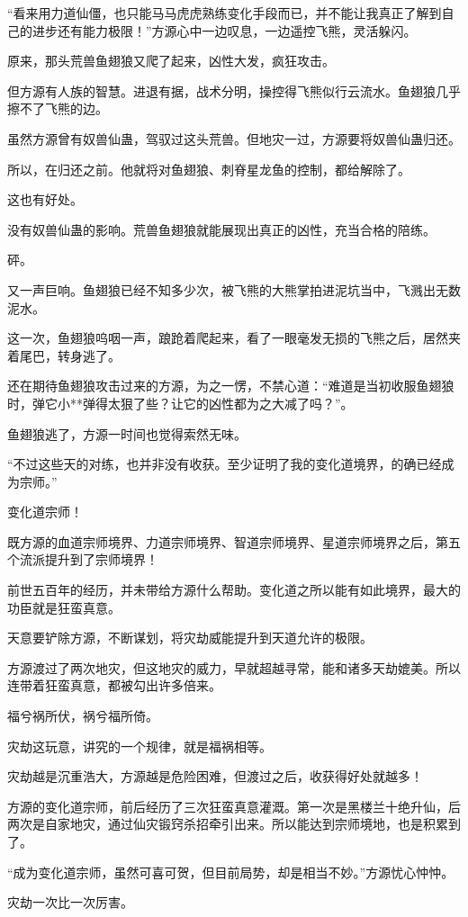 \begin{this_body}
“看来用力道仙僵，也只能马马虎虎熟练变化手段而已，并不能让我真正了解到自己的进步还有能力极限！”方源心中一边叹息，一边遥控飞熊，灵活躲闪。

原来，那头荒兽鱼翅狼又爬了起来，凶性大发，疯狂攻击。

但方源有人族的智慧。进退有据，战术分明，操控得飞熊似行云流水。鱼翅狼几乎擦不了飞熊的边。

虽然方源曾有奴兽仙蛊，驾驭过这头荒兽。但地灾一过，方源要将奴兽仙蛊归还。

所以，在归还之前。他就将对鱼翅狼、刺脊星龙鱼的控制，都给解除了。

这也有好处。

没有奴兽仙蛊的影响。荒兽鱼翅狼就能展现出真正的凶性，充当合格的陪练。

砰。

又一声巨响。鱼翅狼已经不知多少次，被飞熊的大熊掌拍进泥坑当中，飞溅出无数泥水。

这一次，鱼翅狼呜咽一声，踉跄着爬起来，看了一眼毫发无损的飞熊之后，居然夹着尾巴，转身逃了。

还在期待鱼翅狼攻击过来的方源，为之一愣，不禁心道：“难道是当初收服鱼翅狼时，弹它小**弹得太狠了些？让它的凶性都为之大减了吗？”。

鱼翅狼逃了，方源一时间也觉得索然无味。

“不过这些天的对练，也并非没有收获。至少证明了我的变化道境界，的确已经成为宗师。”

变化道宗师！

既方源的血道宗师境界、力道宗师境界、智道宗师境界、星道宗师境界之后，第五个流派提升到了宗师境界！

前世五百年的经历，并未带给方源什么帮助。变化道之所以能有如此境界，最大的功臣就是狂蛮真意。

天意要铲除方源，不断谋划，将灾劫威能提升到天道允许的极限。

方源渡过了两次地灾，但这地灾的威力，早就超越寻常，能和诸多天劫媲美。所以连带着狂蛮真意，都被勾出许多倍来。

福兮祸所伏，祸兮福所倚。

灾劫这玩意，讲究的一个规律，就是福祸相等。

灾劫越是沉重浩大，方源越是危险困难，但渡过之后，收获得好处就越多！

方源的变化道宗师，前后经历了三次狂蛮真意灌溉。第一次是黑楼兰十绝升仙，后两次是自家地灾，通过仙灾锻窍杀招牵引出来。所以能达到宗师境地，也是积累到了。

“成为变化道宗师，虽然可喜可贺，但目前局势，却是相当不妙。”方源忧心忡忡。

灾劫一次比一次厉害。


\end{this_body}
